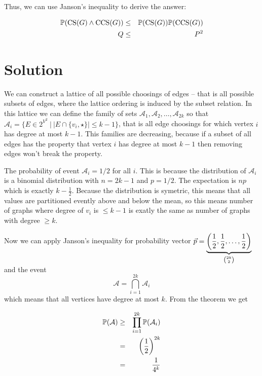 \documentclass[a4paper]{article}
\begin{document}
Thus, we can use Janson's inequality to derive the answer:

\begin{eqnarray*}
  \mathbb{P}(\mathrm{CS}(G) \land \mathrm{CCS}(G)) &\le& \mathbb{P}(\mathrm{CS}(G)) \mathbb{P}(\mathrm{CCS}(G)) \\
  Q &\le& P^2
\end{eqnarray*}

\section{Solution}

We can construct a lattice of all possible choosings of edges -- that is all
possible subsets of edges, where the lattice ordering is induced by the subset
relation. In this lattice we can define the family of sets $ \mathcal{A}_1,
\mathcal{A}_2, \dots, \mathcal{A}_{2k} $ so that $ \mathcal{A}_i = \{ E \in
2^{V^2}\ |\ |E \cap \{ v_i, \star \}| \le k - 1 \} $, that is all edge
choosings for which vertex $ i $ has degree at most $ k - 1 $. This families
are decreasing, because if a subset of all edges has the property that vertex
$ i $ has degree at most $ k - 1 $ then removing edges won't break the
property.

The probability of event $ \mathcal{A}_i = 1/2 $ for all $ i $. This is because
the distribution of $ \mathcal{A}_i $ is a binomial distribution with
$ n = 2k-1 $ and $ p = 1/2 $. The expectation is $ np $ which is exactly
$ k-\frac{1}{2} $. Because the distribution is symetric, this means that all
values are partitioned evently above and below the mean, so this means number
of graphs where degree of $ v_i $ is $ \le k - 1 $ is exatly the same as number
of graphs with degree $ \ge k $.

Now we can apply Janson's inequality for probability vector $ \vec
p = \underbrace{\left(\frac{1}{2}, \frac{1}{2}, \dots, \frac{1}{2}\right)}_{\binom{2k}{2}} $ and the event
$$ \mathcal{A} = \bigcap_{i=1}^{2k} \mathcal{A}_i $$ which means that all
vertices have degree at most $ k $. From the theorem we get

\begin{eqnarray*}
  \mathbb{P}(\mathcal{A}) &\ge& \prod_{i=1}^{2k} \mathbb{P}(\mathcal{A}_i) \\
    &=& \left(\frac{1}{2}\right)^{2k} \\
    &=& \frac{1}{4^k}
\end{eqnarray*}
\end{document}
